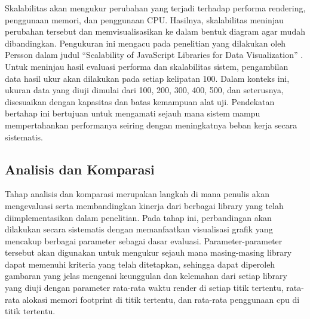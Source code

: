 \begin{enumerate}
	Skalabilitas akan mengukur perubahan yang terjadi terhadap performa rendering, penggunaan memori, dan penggunaan CPU. Hasilnya, skalabilitas meninjau perubahan tersebut dan memvisualisasikan ke dalam bentuk diagram agar mudah dibandingkan. Pengukuran ini mengacu pada penelitian yang dilakukan oleh Persson dalam judul “Scalability of JavaScript Libraries for Data Visualization” \cite{Persson2021}.
	Untuk meninjau hasil evaluasi performa dan skalabilitas sistem, pengambilan data hasil ukur akan dilakukan pada setiap kelipatan 100. Dalam konteks ini, ukuran data yang diuji dimulai dari 100, 200, 300, 400, 500, dan seterusnya, disesuaikan dengan kapasitas dan batas kemampuan alat uji. Pendekatan bertahap ini bertujuan untuk mengamati sejauh mana sistem mampu mempertahankan performanya seiring dengan meningkatnya beban kerja secara sistematis.	
\end{enumerate}

\subsection{Analisis dan Komparasi}
Tahap analisis dan komparasi merupakan langkah di mana penulis akan mengevaluasi serta membandingkan kinerja dari berbagai library yang telah diimplementasikan dalam penelitian. Pada tahap ini, perbandingan akan dilakukan secara sistematis dengan memanfaatkan visualisasi grafik yang mencakup berbagai parameter sebagai dasar evaluasi. Parameter-parameter tersebut akan digunakan untuk mengukur sejauh mana masing-masing library dapat memenuhi kriteria yang telah ditetapkan, sehingga dapat diperoleh gambaran yang jelas mengenai keunggulan dan kelemahan dari setiap library yang diuji dengan parameter rata-rata waktu render di setiap titik tertentu, rata-rata alokasi memori footprint di titik tertentu, dan rata-rata penggunaan cpu di titik tertentu.
